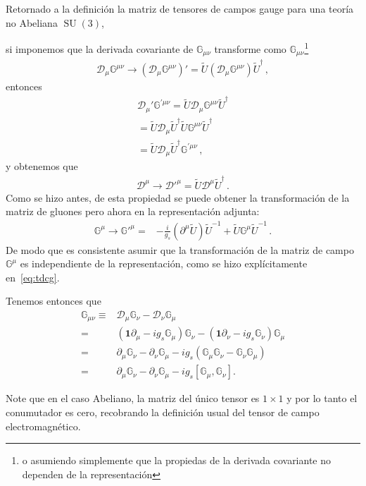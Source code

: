 Retornado a la definición la matriz de tensores de campos gauge para una teoría no Abeliana $\operatorname{SU}(3)$,
\begin{frame}
si imponemos que la derivada covariante de $\mathbb{G}_{\mu\nu}$ transforme como $\mathbb{G}_{\mu\nu}$\footnote{o asumiendo simplemente que la propiedas de la derivada covariante no dependen de la representación}
\begin{align}
  \mathcal{D}_{\mu}\mathbb{G}^{\mu\nu} \to \left(  \mathcal{D}_{\mu}\mathbb{G}^{\mu\nu}  \right)'=
    \widetilde{U} \left( \mathcal{D}_{\mu}\mathbb{G}^{\mu\nu} \right)  \widetilde{U}^{\dagger}\,,
\end{align}
entonces
\begin{align}
  \mathcal{D}_{\mu}'\mathbb{G}^{\prime \mu\nu}
  =\widetilde{U}  \mathcal{D}_{\mu}\mathbb{G}^{\mu\nu}  \widetilde{U}^{\dagger}\nonumber\\
  =\widetilde{U} \mathcal{D}_{\mu}\widetilde{U}^{\dagger} \widetilde{U} \mathbb{G}^{\mu\nu}  \widetilde{U}^{\dagger}\nonumber\\
  =\widetilde{U} \mathcal{D}_{\mu}\widetilde{U}^{\dagger}  \mathbb{G}^{\prime \mu\nu}\,,
\end{align}
y obtenemos que
\begin{align}
{\mathcal{D}}^\mu \to   {\mathcal{D}'}^\mu =\widetilde{U} {\mathcal{D}}^\mu \widetilde{U}^{\dagger}\,.
\end{align}
Como se hizo antes, de esta propiedad se puede obtener la transformación de la matriz de gluones pero ahora en la representación adjunta:
\begin{align}
 \mathbb{G}^{\mu}\to  {\mathbb{G}'}^\mu  =&-\frac{i}{g_s}(\partial^\mu \widetilde{U})\widetilde{U}^{-1}+ \widetilde{U}{\mathbb{G}}^\mu \widetilde{U}^{-1}\,.  
\end{align}
De modo que es consistente asumir que la transformación de la matriz de  campo $\mathbb{G}^{\mu}$ es independiente de la representación, como se hizo explícitamente en~\eqref{eq:tdcg}.
\end{frame}

\begin{frame}
Tenemos entonces que %
\begin{align}
  \mathbb{G}_{\mu\nu}\equiv & \mathcal{D}_{\mu} \mathbb{G}_{\nu}-\mathcal{D}_{\nu} \mathbb{G}_{\mu} \nonumber\\
=&\left( \mathbf{1}\partial_{\mu}-i g_s \mathbb{G}_{\mu} \right)\mathbb{G}_{\nu}-
\left( \mathbf{1}\partial_{\nu}-i g_s \mathbb{G}_{\nu} \right)\mathbb{G}_{\mu}\nonumber\\
=& \partial_{\mu}\mathbb{G}_{\nu}-\partial_{\nu}\mathbb{G}_{\mu}
-ig_s \left(  \mathbb{G}_{\mu}\mathbb{G}_{\nu}-\mathbb{G}_{\nu}\mathbb{G}_{\mu}  \right) \nonumber\\
=& \partial_{\mu}\mathbb{G}_{\nu}-\partial_{\nu}\mathbb{G}_{\mu}
-ig_s \left[  \mathbb{G}_{\mu},\mathbb{G}_{\nu}  \right] .
\end{align}
\end{frame}
Note que en el caso Abeliano, la matriz del único tensor es $1\times1$ y por lo tanto el conumutador es cero, recobrando la definición usual del tensor de campo electromagnético.

